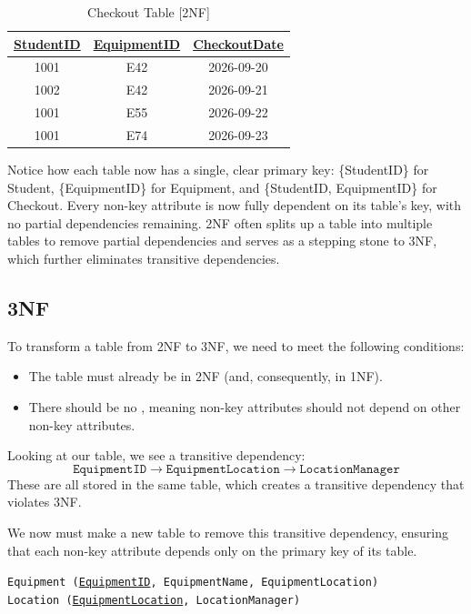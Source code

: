 \begin{table}[H]
\centering
\begin{tabular}{|c|c|c|}
\hline
\underline{StudentID} & \underline{EquipmentID} & \underline{CheckoutDate} \\
\hline
1001 & E42 & 2026-09-20 \\
\hline
1002 & E42 & 2026-09-21 \\
\hline
1001 & E55 & 2026-09-22 \\
\hline
1001 & E74 & 2026-09-23 \\
\hline
\end{tabular}
\caption{Checkout Table [2NF]}
\label{tab:checkout_2nf}
\end{table}

Notice how each table now has a single, clear primary key: \{StudentID\} for Student, \{EquipmentID\} for Equipment, and \{StudentID, EquipmentID\} for Checkout. Every non-key attribute is now fully dependent on its table's key, with no partial dependencies remaining. 2NF often splits up a table into multiple tables to remove partial dependencies and serves as a stepping stone to 3NF, which further eliminates transitive dependencies.

\subsection{3NF}

To transform a table from 2NF to 3NF, we need to meet the following conditions:
\begin{itemize}
\item The table must already be in 2NF (and, consequently, in 1NF).
\item There should be no , meaning non-key attributes should not depend on other non-key attributes.
\end{itemize}
Looking at our table, we see a transitive dependency:
\[
\texttt{EquipmentID}\rightarrow \texttt{EquipmentLocation} \rightarrow \texttt{LocationManager}
\]
These are all stored in the same table, which creates a transitive dependency that violates 3NF.

We now must make a new table to remove this transitive dependency, ensuring that each non-key attribute depends only on the primary key of its table.

\begin{center}
    \texttt{Equipment (\underline{EquipmentID}, EquipmentName, EquipmentLocation)}\\
    \texttt{Location (\underline{EquipmentLocation}, LocationManager)}
\end{center}

